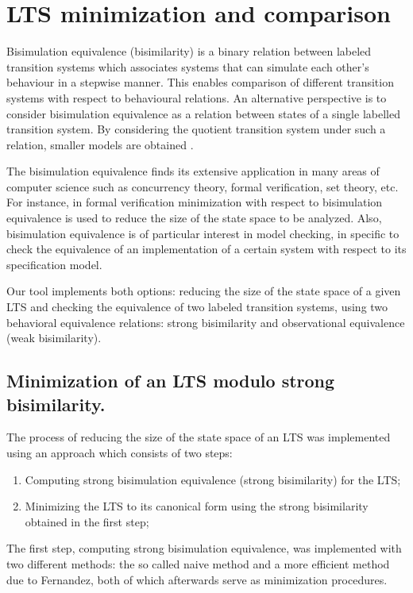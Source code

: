 \section{LTS minimization and comparison}

Bisimulation equivalence (bisimilarity) is a binary relation between labeled transition systems which associates systems that can simulate each other's behaviour in a stepwise manner. This enables comparison of different transition systems with respect to behavioural relations. An alternative perspective is to consider bisimulation equivalence as a relation between states of a single labelled transition system. By considering the quotient transition system under such a relation, smaller models are obtained \cite{ModelChecking}.

The bisimulation equivalence finds its extensive application in many areas of computer science such as concurrency theory, formal verification, set theory, etc. For instance, in formal verification minimization with respect to bisimulation equivalence is used to reduce the size of the state space to be analyzed. Also, bisimulation equivalence is of particular interest in model checking, in specific to check the equivalence of an implementation of a certain system with respect to its specification model.

Our tool implements both options: reducing the size of the state space of a given LTS and checking the equivalence of two labeled transition systems, using two behavioral equivalence relations: strong bisimilarity and observational equivalence (weak bisimilarity).

\subsection{Minimization of an LTS modulo strong bisimilarity.}
The process of reducing the size of the state space of an LTS was implemented using an approach which consists of two steps:
\begin{enumerate}
\item Computing strong bisimulation equivalence (strong bisimilarity) for the LTS;
\item Minimizing the LTS to its canonical form using the strong bisimilarity obtained in the first step;
\end{enumerate}

The first step, computing strong bisimulation equivalence, was implemented with two different methods: the so called
naive method and a more efficient method due to Fernandez, both of which afterwards serve as minimization procedures.

